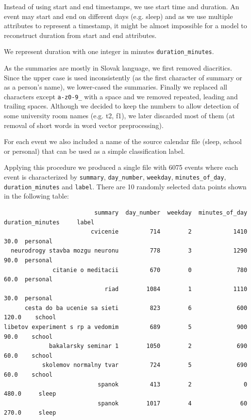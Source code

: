 \documentclass[a4paper, 12pt]{article}
\begin{document}
Instead of using start and end timestamps, we use start time and duration.
An event may start and end on different days (e.g. sleep) and as we use multiple
attributes to represent a timestamp, it might be almost impossible for
a model to reconstruct duration from start and end attributes. 

We represent duration with one integer in minutes \texttt{duration\_minutes}.

\medskip

As the summaries are mostly in Slovak language, we first removed diacritics.
Since the upper case is used inconsistently (as the first character of summary
or as a person's name), we lower-cased the summaries. Finally we replaced all
characters except \texttt{a-z0-9\_} with a space and we removed repeated, leading
and trailing spaces. Although we decided to keep the numbers to allow detection
of some university room names (e.g. t2, f1), we later discarded most of
them (at removal of short words in word vector preprocessing).

\medskip 

For each event we also included a name of the source calendar file (sleep, school
or personal) that can be used as a simple classification label.

\medskip

Applying this procedure we produced a single file with 6075 events
where each event is characterized by 
\texttt{summary}, \texttt{day\_number}, \texttt{weekday}, \texttt{minutes\_of\_day},
\texttt{duration\_minutes} and \texttt{label}. There are 10 randomly selected data 
points shown in the following table:

\begin{footnotesize}
\begin{verbatim}
                          summary  day_number  weekday  minutes_of_day  duration_minutes     label
                         cvicenie         714        2            1410              30.0  personal
  neurodrogy stavba mozgu neuronu         778        3            1290              90.0  personal
              citanie o meditacii         670        0             780              60.0  personal
                             riad        1084        1            1110              30.0  personal
      cesta do ba ucenie sa sieti         823        6             600             120.0    school
libetov experiment s rp a vedomim         689        5             900              90.0    school
             bakalarsky seminar 1        1050        2             690              60.0    school
           skolemov normalny tvar         724        5             690              60.0    school
                           spanok         413        2               0             480.0     sleep
                           spanok        1017        4              60             270.0     sleep
\end{verbatim}
\end{footnotesize}
\end{document}
